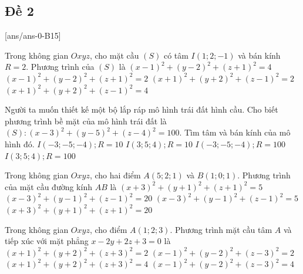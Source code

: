 \subsection{Đề 2}
[ans/ans-0-B15]
\caulc%

\begin{ex}%
	Trong không gian $Oxyz$, cho mặt cầu $(S)$ có tâm $I(1;2;-1)$ và bán kính $R=2$. Phương trình của $(S)$ là
	\choice
	{\True $(x-1)^2+(y-2)^2+(z+1)^2=4$}
	{$(x-1)^2+(y-2)^2+(z+1)^2=2$}
	{$(x+1)^2+(y+2)^2+(z-1)^2=2$}
	{$(x+1)^2+(y+2)^2+(z-1)^2=4$}
\end{ex}

\begin{ex}%
	Người ta muốn thiết kế một bộ lắp ráp mô hình trái đất hình cầu. Cho biết phương trình bề mặt của mô hình trái đất là $(S) \colon (x-3)^2+(y-5)^2+(z-4)^2=100$. Tìm tâm và bán kính của mô hình đó.
	\choice
	{$I(-3;-5;-4);R=10$}
	{\True $I(3;5;4);R=10$}
	{$I(-3;-5;-4);R=100$}
	{$I(3;5;4);R=100$}
\end{ex}

\begin{ex}%
	Trong không gian $Oxyz$, cho hai điểm $A(5;2;1)$ và $B(1;0;1)$. Phương trình của mặt cầu đường kính $AB$ là
	\choice
	{$(x+3)^2+(y+1)^2+(z+1)^2=5$}
	{$(x-3)^2+(y-1)^2+(z-1)^2=20$}
	{\True $(x-3)^2+(y-1)^2+(z-1)^2=5$}
	{$(x+3)^2+(y+1)^2+(z+1)^2=20$}
\end{ex}

\begin{ex}%
	Trong không gian $O x y z$, cho điểm $A(1;2;3)$. Phương trình mặt cầu tâm $A$ và tiếp xúc với mặt phẳng $x-2y+2z+3=0$ là
	\choice
	{$(x+1)^2+(y+2)^2+(z+3)^2=2$}
	{$(x-1)^2+(y-2)^2+(z-3)^2=2$}
	{$(x+1)^2+(y+2)^2+(z+3)^2=4$}
	{\True $(x-1)^2+(y-2)^2+(z-3)^2=4$}
\end{ex}

